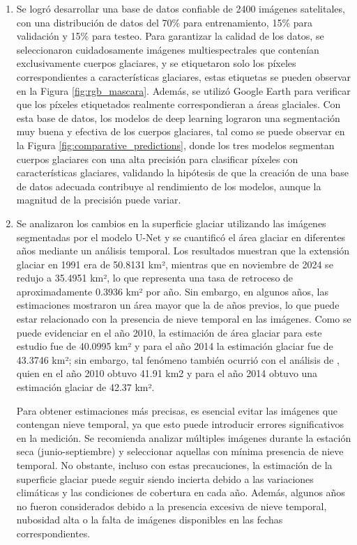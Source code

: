 \begin{enumerate}
	\item Se logró desarrollar una base de datos confiable de 2400 imágenes satelitales, con una distribución de datos del 70\% para entrenamiento, 15\% para validación y 15\% para testeo. Para garantizar la calidad de los datos, se seleccionaron cuidadosamente imágenes multiespectrales que contenían exclusivamente cuerpos glaciares, y se etiquetaron solo los píxeles correspondientes a características glaciares, estas etiquetas se pueden observar en la Figura \ref{fig:rgb_mascara}. Además, se utilizó Google Earth para verificar que los píxeles etiquetados realmente correspondieran a áreas glaciales. Con esta base de datos, los modelos de deep learning lograron una segmentación muy buena y efectiva de los cuerpos glaciares, tal como se puede observar en la Figura \ref{fig:comparative_predictions}, donde los tres modelos segmentan cuerpos glaciares con una alta precisión para clasificar píxeles con características glaciares, validando la hipótesis de que la creación de una base de datos adecuada contribuye al rendimiento de los modelos, aunque la magnitud de la precisión puede variar.
	
	\item Se analizaron los cambios en la superficie glaciar utilizando las imágenes segmentadas por el modelo U-Net y se cuantificó el área glaciar en diferentes años mediante un análisis temporal. Los resultados muestran que la extensión glaciar en 1991 era de 50.8131 km², mientras que en noviembre de 2024 se redujo a 35.4951 km², lo que representa una tasa de retroceso de aproximadamente 0.3936 km² por año. Sin embargo, en algunos años, las estimaciones mostraron un área mayor que la de años previos, lo que puede estar relacionado con la presencia de nieve temporal en las imágenes. Como se puede evidenciar en el año 2010, la estimación de área glaciar para este estudio fue de 40.0995 km² y para el año 2014 la estimación glaciar fue de 43.3746 km²; sin embargo, tal fenómeno también ocurrió con el análisis de \parencite{malone2022evolution}, quien en el año 2010 obtuvo 41.91 km2 y para el año 2014 obtuvo una estimación glaciar de 42.37 km².
	
	Para obtener estimaciones más precisas, es esencial evitar las imágenes que contengan nieve temporal, ya que esto puede introducir errores significativos en la medición. Se recomienda analizar múltiples imágenes durante la estación seca (junio-septiembre) y seleccionar aquellas con mínima presencia de nieve temporal. No obstante, incluso con estas precauciones, la estimación de la superficie glaciar puede seguir siendo incierta debido a las variaciones climáticas y las condiciones de cobertura en cada año. Además, algunos años no fueron considerados debido a la presencia excesiva de nieve temporal, nubosidad alta o la falta de imágenes disponibles en las fechas correspondientes.
	

\end{enumerate}
